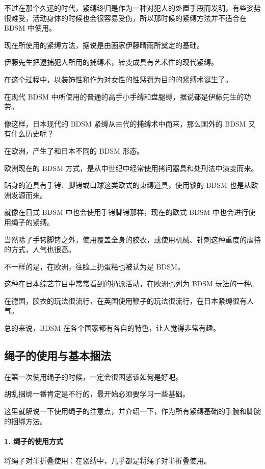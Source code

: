 \documentclass[12pt,UTF8]{ctexbook}
\begin{document}
不过在那个久远的时代，紧缚终归是作为一种对犯人的处置手段而发明，有些姿势很难受，活动身体的时候也会很容易受伤，所以那时候的紧缚方法并不适合在 BDSM 中使用。

现在所使用的紧缚方法，据说是由画家伊藤晴雨所奠定的基础。

伊藤先生把逮捕犯人所用的捕缚术，转变成具有艺术性的现代紧缚。

在这个过程中，以装饰性和作为对女性的性惩罚为目的的紧缚术诞生了。

在现代 BDSM 中所使用的普通的高手小手缚和盘腿缚，据说都是伊藤先生的功劳。

像这样，日本现代的 BDSM 紧缚从古代的捕缚术中而来，那么国外的 BDSM 又有什么历史呢？

在欧洲，产生了和日本不同的 BDSM 形态。

欧洲现在的 BDSM 方式，是从中世纪中经常使用拷问器具和处刑法中演变而来。

贴身的道具有手铐、脚铐或口球这类欧式的束缚道具，使用锁的 BDSM 也是从欧洲发源而来。

就像在日式 BDSM 中也会使用手铐脚铐那样，现在的欧式 BDSM 中也会进行使用绳子的紧缚。

当然除了手铐脚铐之外，使用覆盖全身的胶衣，或使用机械、针刺这种重度的虐待的方式，人气也很高。

不一样的是，在欧洲，往脸上扔蛋糕也被认为是 BDSM。

这种在日本综艺节目中常常看到的扔派活动，在欧洲也列为 BDSM 玩法的一种。

在德国，胶衣的玩法很流行，在英国使用鞭子的玩法很流行，在日本紧缚很有人气。

总的来说，BDSM 在各个国家都有各自的特色，让人觉得非常有趣。

\subsection{绳子的使用与基本捆法}

在第一次使用绳子的时候，一定会很困惑该如何是好吧。

胡乱捆绑一番肯定是不行的，最开始必须要学习一些基础。

这里就解说一下使用绳子的注意点，并介绍一下，作为所有紧缚基础的手腕和脚腕的捆绑方法。

\paragraph{1. 绳子的使用方式}

将绳子对半折叠使用：在紧缚中，几乎都是将绳子对半折叠使用。
\end{document}
